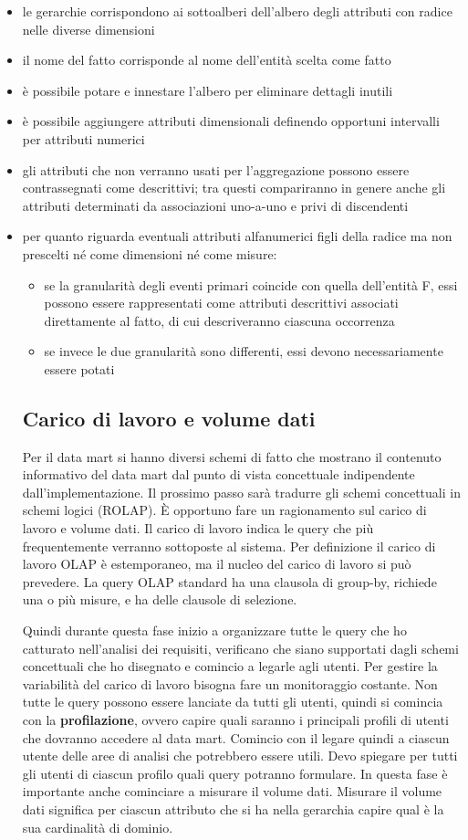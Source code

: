 \begin{itemize}
	\item 
	le gerarchie corrispondono ai sottoalberi dell’albero degli attributi con radice nelle diverse dimensioni
	\item 
	il nome del fatto corrisponde al nome dell’entità scelta come fatto
	\item 
	è possibile potare e innestare l’albero per eliminare dettagli inutili
	\item 
	è possibile aggiungere attributi dimensionali definendo opportuni intervalli per attributi numerici
	\item 
	gli attributi che non verranno usati per l’aggregazione possono essere contrassegnati come descrittivi; tra questi compariranno in genere anche gli attributi determinati da associazioni uno-a-uno e privi di discendenti
	\item 
	per quanto riguarda eventuali attributi alfanumerici figli della radice ma non prescelti né come dimensioni né come misure:
	\begin{itemize}
		\item 
		se la granularità degli eventi primari coincide con quella dell’entità F, essi possono essere rappresentati come attributi descrittivi associati direttamente al fatto, di cui descriveranno ciascuna occorrenza
		\item 
		se invece le due granularità sono differenti, essi devono necessariamente essere potati
	\end{itemize}
\subsection{Carico di lavoro e volume dati}
Per il data mart si hanno diversi schemi di fatto che mostrano il contenuto informativo del data mart dal punto di vista concettuale indipendente dall’implementazione. Il prossimo passo sarà tradurre gli schemi concettuali in schemi logici (ROLAP). È opportuno fare un ragionamento sul carico di lavoro e volume dati. Il carico di lavoro indica le query che più frequentemente verranno sottoposte al sistema. Per definizione il carico di lavoro OLAP è estemporaneo, ma il nucleo del carico di lavoro si può prevedere. La query OLAP standard ha una clausola di group-by, richiede una o più misure, e ha delle clausole di selezione. 

Quindi durante questa fase inizio a organizzare tutte le query che ho catturato nell'analisi dei requisiti, verificano che siano supportati dagli schemi concettuali che ho disegnato e comincio a legarle agli utenti. Per gestire la variabilità del carico di lavoro bisogna fare un monitoraggio costante. Non tutte le query possono essere lanciate da tutti gli utenti, quindi si comincia con la \textbf{profilazione}, ovvero capire quali saranno i principali profili di utenti che dovranno accedere al data mart. Comincio con il legare quindi a ciascun utente delle aree di analisi che potrebbero essere utili. Devo spiegare per tutti gli utenti di ciascun profilo quali query potranno formulare. In questa fase è importante anche cominciare a misurare il volume dati. Misurare il volume dati significa per ciascun attributo che si ha nella gerarchia capire qual è la sua cardinalità di dominio. 

\end{itemize}

